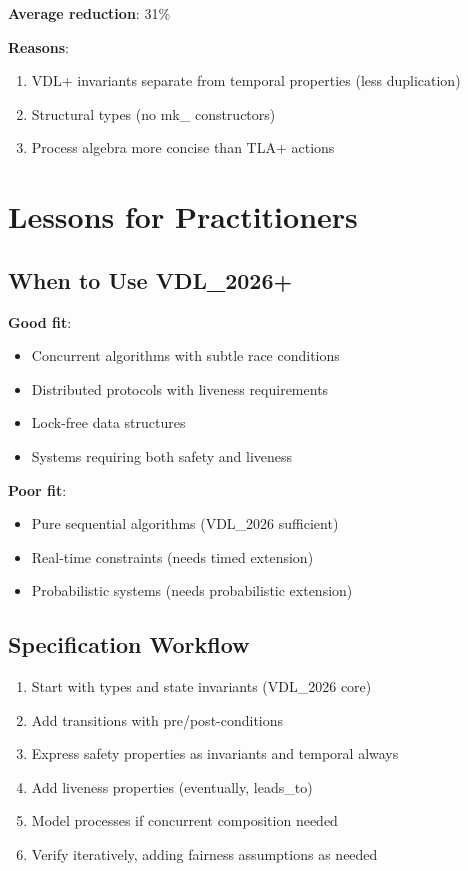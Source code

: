 \documentclass[conference]{IEEEtran}
\begin{document}
\textbf{Average reduction}: 31\%

\textbf{Reasons}:
\begin{enumerate}
\item VDL+ invariants separate from temporal properties (less duplication)
\item Structural types (no mk\_ constructors)
\item Process algebra more concise than TLA+ actions
\end{enumerate}

\section{Lessons for Practitioners}

\subsection{When to Use VDL\_2026+}

\textbf{Good fit}:
\begin{itemize}
\item Concurrent algorithms with subtle race conditions
\item Distributed protocols with liveness requirements
\item Lock-free data structures
\item Systems requiring both safety and liveness
\end{itemize}

\textbf{Poor fit}:
\begin{itemize}
\item Pure sequential algorithms (VDL\_2026 sufficient)
\item Real-time constraints (needs timed extension)
\item Probabilistic systems (needs probabilistic extension)
\end{itemize}

\subsection{Specification Workflow}

\begin{enumerate}
\item Start with types and state invariants (VDL\_2026 core)
\item Add transitions with pre/post-conditions
\item Express safety properties as invariants and temporal always
\item Add liveness properties (eventually, leads\_to)
\item Model processes if concurrent composition needed
\item Verify iteratively, adding fairness assumptions as needed
\end{enumerate}
\end{document}
